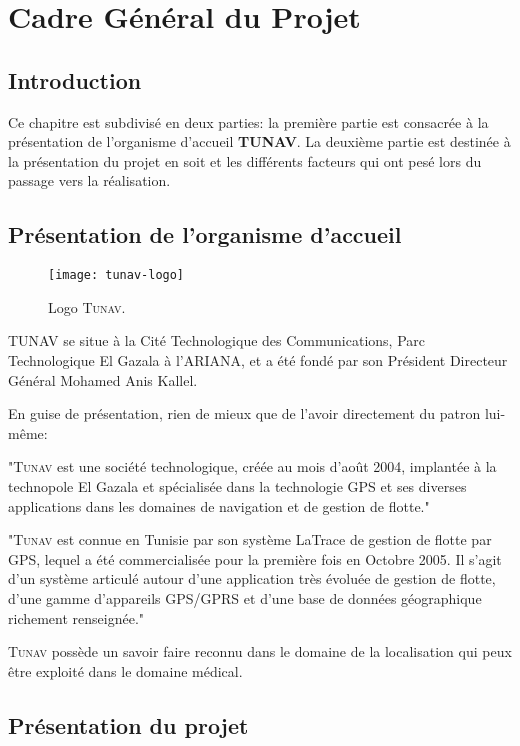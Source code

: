 
\chapter{Cadre Général du Projet}
\section{Introduction}

Ce chapitre est subdivisé en deux parties: la première partie est
consacrée à la présentation de l’organisme d’accueil \textbf{TUNAV}. La
deuxième partie est destinée à la présentation du projet en soit et les
différents facteurs qui ont pesé lors du passage vers la réalisation.

\section{Présentation de l'organisme d'accueil}  

\begin{figure}
\center
\texttt{[image: tunav-logo]}
\caption{Logo \textsc{Tunav}.}
\end{figure}

TUNAV se situe à la Cité Technologique des Communications, Parc
Technologique El Gazala à l’ARIANA, et a été fondé par son Président
Directeur Général Mohamed Anis Kallel.

En guise de présentation, rien de mieux que de l’avoir directement du patron lui-même\cite{index_tunisie}:

"\textsc{Tunav} est une société technologique, créée au mois d’août
2004, implantée à la technopole El Gazala et spécialisée dans la
technologie GPS et ses diverses applications dans les domaines de
navigation et de gestion de flotte."

"\textsc{Tunav} est connue en Tunisie par son système \og{}LaTrace\fg{}
de gestion de flotte par GPS, lequel a été commercialisée pour la
première fois en Octobre 2005. Il s'agit d'un système articulé autour
d'une application très évoluée de gestion de flotte, d'une gamme
d'appareils GPS/GPRS et d'une base de données géographique richement
renseignée."

\textsc{Tunav} possède un savoir faire reconnu dans le domaine de la
localisation qui peux être exploité dans le domaine médical.

\section{Présentation du projet}

